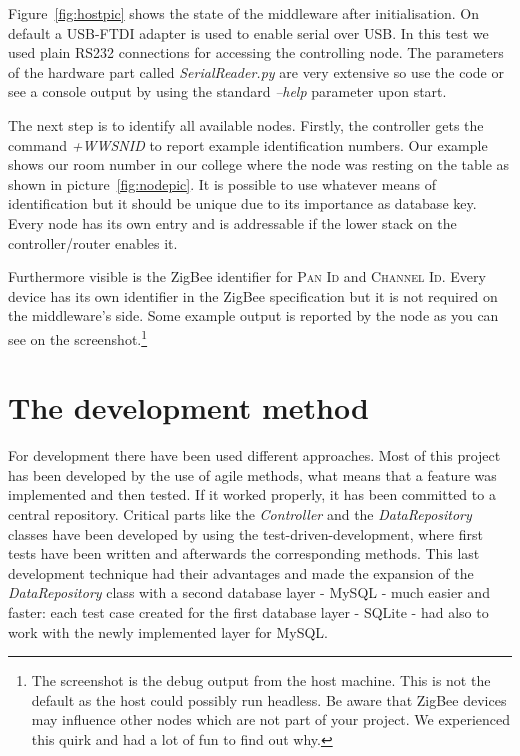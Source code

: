 Figure~\ref{fig:hostpic} shows the state of the middleware after initialisation. On default a USB-FTDI adapter is used to enable serial over USB.
In this test we used plain RS232 connections for accessing the controlling node. The parameters of the hardware part called \textit{SerialReader.py}
are very extensive so use the code or see a console output by using the standard \textit{--help} parameter upon start.

The next step is to identify all available nodes. Firstly, the controller gets the command \textit{+WWSNID} to report example identification numbers.
Our example shows our room number in our college where the node was resting on the table as shown in picture~\ref{fig:nodepic}. It is possible 
to use whatever means of identification but it should be unique due to its importance as database key. Every node has its own 
entry and is addressable if the lower stack on the controller/router enables it.

Furthermore visible is the ZigBee identifier for \textsc{Pan Id} and \textsc{Channel Id}. Every device has its own identifier in the ZigBee specification
but it is not required on the middleware's side. Some example output is reported by the node as you can see on the screenshot.\footnote{The screenshot
    is the debug output from the host machine. This is not the default as the host could possibly run headless. Be aware that ZigBee devices may influence
other nodes which are not part of your project. We experienced this quirk and had a lot of fun to find out why.}

\newpage
\section{The development method}

For development there have been used different approaches. Most of this project has been developed by the use of agile methods, 
what means that a feature was implemented and then tested. If it worked properly, it has been committed to a central repository. 
Critical parts like the \textit{Controller} and the \textit{DataRepository} classes have been developed by using the test-driven-development, 
where first tests have been written and afterwards the corresponding methods. This last development technique had their advantages and made 
the expansion of the \textit{DataRepository} class with a second database layer - MySQL - much easier and faster: each test case 
created for the first database layer - SQLite - had also to work with the newly implemented layer for MySQL.


